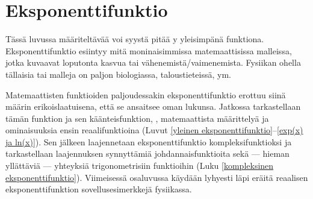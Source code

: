 \chapter{Eksponenttifunktio}  \label{eksponenttifunktio}

Tässä luvussa määriteltävää  voi syystä pitää
y yleisimpänä funktiona. Eksponenttifunktio esiintyy mitä
moninaisimmissa matemaattisissa malleissa, jotka kuvaavat loputonta kasvua tai 
vähenemistä/vaimenemista. Fysiikan ohella tällaisia  tai 
 malleja on paljon biologiassa, taloustieteissä, ym.

Matemaattisten funktioiden paljoudessakin eksponenttifunktio erottuu siinä määrin 
erikoislaatuisena, että se ansaitsee oman lukunsa. Jatkossa tarkastellaan tämän funktion
ja sen käänteisfunktion, , matemaattista määrittelyä ja ominaisuuksia
ensin reaalifunktioina (Luvut \ref{yleinen eksponenttifunktio}--\ref{exp(x) ja ln(x)}). Sen
jälkeen laajennetaan eksponenttifunktio kompleksifunktioksi ja tarkastellaan laajennuksen
synnyttämiä johdannaisfunktioita sekä ---  hieman yllättäviä --- yhteyksiä trigonometrisiin
funktioihin (Luku \ref{kompleksinen eksponenttifunktio}). Viimeisessä osaluvussa käydään
lyhyesti läpi eräitä reaalisen eksponenttifunktion sovellusesimerkkejä fysiikassa.